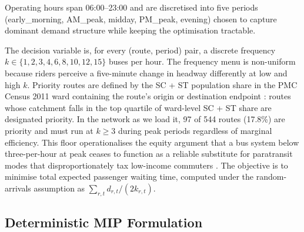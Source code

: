 \documentclass[a4paper,twoside]{article}
\begin{document}
Operating hours span 06:00--23:00 and are discretised into five
periods (early\_morning, AM\_peak, midday, PM\_peak, evening)
chosen to capture dominant demand structure while keeping the
optimisation tractable.

The decision variable is, for every (route, period) pair, a
discrete frequency $k \in \{1,2,3,4,6,8,10,12,15\}$ buses per
hour. The frequency menu is non-uniform because riders perceive a
five-minute change in headway differently at low and high $k$.
Priority routes are defined by the SC + ST population share in the
PMC Census 2011 ward containing the route's origin or destination
endpoint \cite{opencity2024census,census2011india}: routes whose
catchment falls in the top quartile of ward-level SC + ST share
are designated priority. In the network as we load it, 97 of 544
routes (17.8\%) are priority and must run at $k \geq 3$ during
peak periods regardless of marginal efficiency. This floor
operationalises the equity argument that a bus system below
three-per-hour at peak ceases to function as a reliable
substitute for paratransit modes that disproportionately tax
low-income commuters \cite{mahadevia2013brt}. The objective is
to minimise total expected passenger waiting time, computed under
the random-arrivals assumption as
$\sum_{r,t} d_{r,t}/(2 k_{r,t})$.

\subsection{Deterministic MIP Formulation}
\label{sec:mip}
\end{document}

